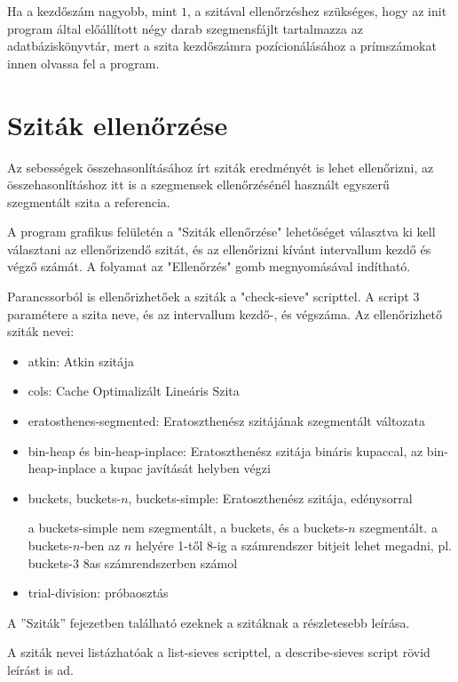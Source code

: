 Ha a kezdőszám nagyobb, mint $1$, a szitával ellenőrzéshez szükséges,
hogy az init program által előállított négy darab szegmensfájlt tartalmazza
az adatbáziskönyvtár, mert a szita kezdőszámra pozícionálásához a prímszámokat
innen olvassa fel a program.

\section{Sziták ellenőrzése}  %

Az sebességek összehasonlításához írt sziták eredményét is lehet ellenőrizni,
az összehasonlításhoz itt is a szegmensek ellenőrzésénél használt
egyszerű szegmentált szita a referencia.

A program grafikus felületén a "Sziták ellenőrzése" lehetőséget
választva ki kell választani az ellenőrizendő szitát, és az ellenőrizni
kívánt intervallum kezdő és végző számát.
A folyamat az "Ellenőrzés" gomb megnyomásával indítható.

Parancssorból is ellenőrizhetőek a sziták a "check-sieve" scripttel.
A script 3 paramétere a szita neve, és az intervallum kezdő-, és végszáma.
Az ellenőrizhető sziták nevei:

\begin{itemize}
\item atkin: Atkin szitája\cite{atkin}
\item cols: Cache Optimalizált Lineáris Szita
\item eratosthenes-segmented: Eratoszthenész szitájának szegmentált változata
\item bin-heap és bin-heap-inplace: Eratoszthenész szitája bináris kupaccal,
	az bin-heap-inplace a kupac javítását helyben végzi
\item buckets, buckets-$n$, buckets-simple: Eratoszthenész szitája, edénysorral

	a buckets-simple nem szegmentált, a buckets, és a buckets-$n$ szegmentált.
	a buckets-$n$-ben az $n$ helyére 1-től 8-ig a számrendszer bitjeit lehet megadni,
	pl. buckets-$3$ 8as számrendszerben számol
\item trial-division: próbaosztás
\end{itemize}

A ''Sziták'' fejezetben található ezeknek a szitáknak a részletesebb leírása.

A sziták nevei listázhatóak a list-sieves scripttel, a describe-sieves script rövid leírást
is ad.

